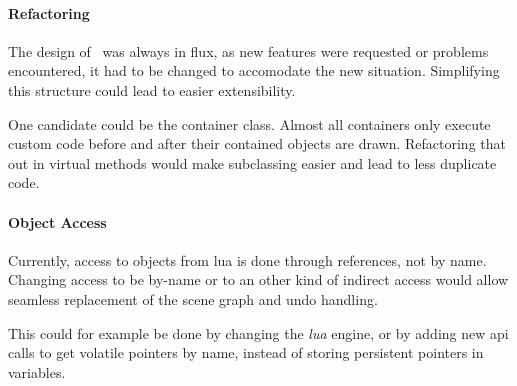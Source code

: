 \paragraph{Refactoring}
The design of \ER\ was always in flux, as new features were requested or problems encountered, it had to be changed to accomodate the new situation.
Simplifying this structure could lead to easier extensibility.

One candidate could be the container class.
Almost all containers only execute custom code before and after their contained objects are drawn.
Refactoring that out in virtual methods would make subclassing easier and lead to less duplicate code.

\paragraph{Object Access}
Currently, access to objects from lua is done through references, not by name.
Changing access to be by-name or to an other kind of indirect access would allow seamless replacement of the scene graph and undo handling.

This could for example be done by changing the \textit{lua} engine, or by adding new api calls to get volatile pointers by name, instead of storing persistent pointers in variables.

